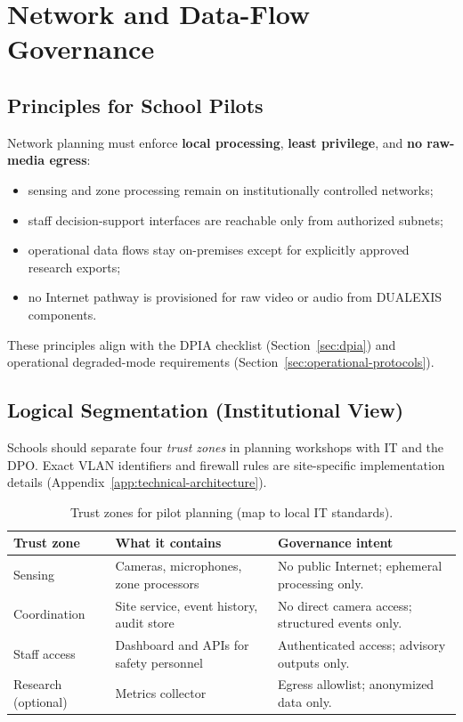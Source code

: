 \section{Network and Data-Flow Governance}
\label{sec:network-requirements}

\subsection{Principles for School Pilots}

Network planning must enforce \textbf{local processing}, \textbf{least privilege}, and
\textbf{no raw-media egress}:

\begin{itemize}[noitemsep]
  \item sensing and zone processing remain on institutionally controlled networks;
  \item staff decision-support interfaces are reachable only from authorized subnets;
  \item operational data flows stay on-premises except for explicitly approved research exports;
  \item no Internet pathway is provisioned for raw video or audio from DUALEXIS components.
\end{itemize}

These principles align with the DPIA checklist (Section~\ref{sec:dpia}) and operational
degraded-mode requirements (Section~\ref{sec:operational-protocols}).

\subsection{Logical Segmentation (Institutional View)}

Schools should separate four \emph{trust zones} in planning workshops with IT and the DPO.
Exact VLAN identifiers and firewall rules are site-specific implementation details
(Appendix~\ref{app:technical-architecture}).

\begin{table}[htbp]
  \centering
  \caption{Trust zones for pilot planning (map to local IT standards).}
  \label{tab:trust-zones}
  \small
  \begin{tabular}{@{}p{3.0cm}p{4.0cm}p{5.0cm}@{}}
    \toprule
    Trust zone & What it contains & Governance intent \\
    \midrule
    Sensing &
      Cameras, microphones, zone processors &
      No public Internet; ephemeral processing only. \\
    Coordination &
      Site service, event history, audit store &
      No direct camera access; structured events only. \\
    Staff access &
      Dashboard and APIs for safety personnel &
      Authenticated access; advisory outputs only. \\
    Research (optional) &
      Metrics collector &
      Egress allowlist; anonymized data only. \\
    \bottomrule
  \end{tabular}
\end{table}

